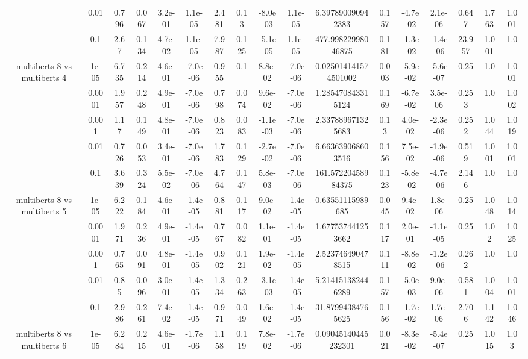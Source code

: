 \begin{tabular}{|c|c|c|c|c|c|c|c|c|c|c|c|c|c|c|c|c|}
 & 0.01 & 0.796 & 0.067 & 3.2e-01 & 1.1e-05 & 2.481 & 0.13 & -8.0e-03 & 1.1e-05 & 6.397890090942383 & 0.157 & -4.7e-02 & 2.1e-06 & 0.647 & 1.763 & 1.001 \\
 & 0.1 & 2.67 & 0.134 & 4.7e-02 & 1.1e-05 & 7.987 & 0.125 & -5.1e-05 & 1.1e-05 & 477.99822998046875 & 0.181 & -1.3e-02 & -1.4e-06 & 23.957 & 1.001 & 1.0 \\
\hline
\multirow{5}{*}{multiberts 8 vs multiberts 4} & 1e-05 & 6.735 & 0.214 & 4.6e-01 & -7.0e-06 & 0.955 & 0.1 & 8.8e-02 & -7.0e-06 & 0.025014141574501002 & 0.003 & -5.9e-02 & -5.6e-07 & 0.25 & 1.0 & 1.001 \\
 & 0.0001 & 1.957 & 0.248 & 4.9e-01 & -7.0e-06 & 0.798 & 0.074 & 9.6e-02 & -7.0e-06 & 1.285470843315124 & 0.169 & -6.7e-02 & 3.5e-06 & 0.253 & 1.0 & 1.002 \\
 & 0.001 & 1.17 & 0.149 & 4.8e-01 & -7.0e-06 & 0.823 & 0.083 & -1.1e-03 & -7.0e-06 & 2.337889671325683 & 0.13 & 4.0e-02 & -2.3e-06 & 0.252 & 1.044 & 1.019 \\
 & 0.01 & 0.726 & 0.053 & 3.4e-01 & -7.0e-06 & 1.783 & 0.129 & -2.7e-02 & -7.0e-06 & 6.663639068603516 & 0.156 & 7.5e-02 & -1.9e-06 & 0.519 & 1.001 & 1.001 \\
 & 0.1 & 3.639 & 0.324 & 5.5e-02 & -7.0e-06 & 4.764 & 0.147 & 5.8e-03 & -7.0e-06 & 161.57220458984375 & 0.123 & -5.8e-02 & -4.7e-06 & 2.146 & 1.0 & 1.0 \\
\hline
\multirow{5}{*}{multiberts 8 vs multiberts 5} & 1e-05 & 6.222 & 0.184 & 4.6e-01 & -1.4e-05 & 0.881 & 0.117 & 9.0e-02 & -1.4e-05 & 0.63551115989685 & 0.045 & 9.4e-02 & 1.8e-06 & 0.25 & 1.048 & 1.014 \\
 & 0.0001 & 1.971 & 0.236 & 4.9e-01 & -1.4e-05 & 0.767 & 0.082 & 1.1e-01 & -1.4e-05 & 1.677537441253662 & 0.117 & 2.0e-01 & -1.1e-05 & 0.25 & 1.02 & 1.025 \\
 & 0.001 & 0.765 & 0.091 & 4.8e-01 & -1.4e-05 & 0.902 & 0.121 & 1.9e-02 & -1.4e-05 & 2.523746490478515 & 0.111 & -8.8e-02 & -1.2e-06 & 0.262 & 1.0 & 1.0 \\
 & 0.01 & 0.85 & 0.096 & 3.0e-01 & -1.4e-05 & 1.334 & 0.263 & -3.1e-03 & -1.4e-05 & 5.214151382446289 & 0.157 & -5.0e-03 & 9.0e-06 & 0.581 & 1.004 & 1.001 \\
 & 0.1 & 2.986 & 0.261 & 7.4e-02 & -1.4e-05 & 0.971 & 0.049 & 1.6e-02 & -1.4e-05 & 31.87994384765625 & 0.156 & -1.7e-02 & 1.7e-06 & 2.706 & 1.142 & 1.046 \\
\hline
\multirow{5}{*}{multiberts 8 vs multiberts 6} & 1e-05 & 6.284 & 0.215 & 4.6e-01 & -1.7e-06 & 1.158 & 0.119 & 7.8e-02 & -1.7e-06 & 0.09045140445232301 & 0.021 & -8.3e-02 & -5.4e-07 & 0.25 & 1.015 & 1.03 \\

\end{tabular}
